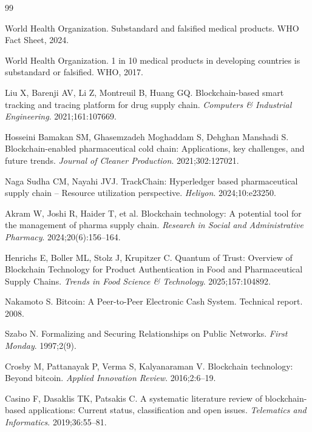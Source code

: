 \documentclass[11pt,a4paper]{article}
\begin{document}
\begin{thebibliography}{99}

World Health Organization. Substandard and falsified medical products. WHO Fact Sheet, 2024.

World Health Organization. 1 in 10 medical products in developing countries is substandard or falsified. WHO, 2017.

Liu X, Barenji AV, Li Z, Montreuil B, Huang GQ. Blockchain-based smart tracking and tracing platform for drug supply chain. \textit{Computers \& Industrial Engineering}. 2021;161:107669.

Hosseini Bamakan SM, Ghasemzadeh Moghaddam S, Dehghan Manshadi S. Blockchain-enabled pharmaceutical cold chain: Applications, key challenges, and future trends. \textit{Journal of Cleaner Production}. 2021;302:127021.

Naga Sudha CM, Nayahi JVJ. TrackChain: Hyperledger based pharmaceutical supply chain -- Resource utilization perspective. \textit{Heliyon}. 2024;10:e23250.

Akram W, Joshi R, Haider T, et al. Blockchain technology: A potential tool for the management of pharma supply chain. \textit{Research in Social and Administrative Pharmacy}. 2024;20(6):156--164.

Henrichs E, Boller ML, Stolz J, Krupitzer C. Quantum of Trust: Overview of Blockchain Technology for Product Authentication in Food and Pharmaceutical Supply Chains. \textit{Trends in Food Science \& Technology}. 2025;157:104892.

Nakamoto S. Bitcoin: A Peer-to-Peer Electronic Cash System. Technical report. 2008.

Szabo N. Formalizing and Securing Relationships on Public Networks. \textit{First Monday}. 1997;2(9).

Crosby M, Pattanayak P, Verma S, Kalyanaraman V. Blockchain technology: Beyond bitcoin. \textit{Applied Innovation Review}. 2016;2:6--19.

Casino F, Dasaklis TK, Patsakis C. A systematic literature review of blockchain-based applications: Current status, classification and open issues. \textit{Telematics and Informatics}. 2019;36:55--81.


\end{thebibliography}
\end{document}

